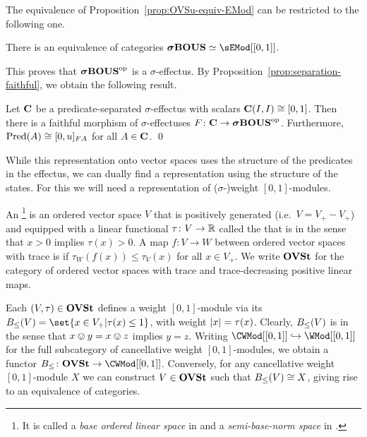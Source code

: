 \documentclass[%
	submission,
copyright,creativecommons,UKenglish]{eptcs}
\begin{document}
The equivalence
of Proposition~\ref{prop:OVSu-equiv-EMod}
can be restricted to the following one.

\begin{proposition}
\label{prop:sBOUS-equiv-sEMod}
There is an equivalence of categories $\sBOUS\simeq\sEMod[[0,1]]$.
\end{proposition}

This proves that $\boldsymbol{\sigma}\mathbf{BOUS}^{\mathrm{op}}$ is a $\sigma$-effectus.
By Proposition~\ref{prop:separation-faithful},
we obtain the following result.

\begin{theorem}\label{thm:convex-effectus-embedding}
Let $\mathbf{C}$ be a predicate-separated $\sigma$-effectus with scalars $\mathbf{C}(I,I)\cong [0,1]$.
Then there is a faithful morphism of $\sigma$-effectuses $F\colon\mathbf{C}\to \boldsymbol{\sigma}\mathbf{BOUS}^{\mathrm{op}}$.
Furthermore, $\mathrm{Pred}(A)\cong [0,u]_{FA}$ for all $A\in \mathbf{C}$. \qed
\end{theorem}

While this representation onto vector spaces uses the structure of the predicates in the effectus, we can dually find a representation using the structure of the states.
For this we will need a representation of ($\sigma$-)weight $[0,1]$-modules.

\begin{definition}
An \footnote{%
It is called a \emph{base ordered linear space}
in \cite{Pumpluen2002}
and a \emph{semi-base-norm space} in \cite{Cho2019PhD}.}
is an ordered vector space $V$
that is positively generated (i.e.\ $V=V_+-V_+$)
and equipped with
a linear functional $\tau\colon V\to \mathbb{R}$ 
called the 
that is 
in the sense that $x>0$ implies $\tau(x)>0$.
A map $f\colon V\to W$ between
ordered vector spaces with trace
is  if
$\tau_W(f(x))\le \tau_V(x)$ for all $x\in V_+$.
We write $\mathbf{OVSt}$ for the category of
ordered vector spaces with trace
and trace-decreasing positive linear maps.
\end{definition}

Each $(V,\tau)\in \mathbf{OVSt}$
defines a weight $[0,1]$-module
via its 
$\sBase(V) =\set{x\in V_+ | \tau(x)\le 1}$, 
with weight $\lvert x\rvert=\tau(x)$.
Clearly, $B_{\le}(V)$ is 
in the sense that $x\ovee y=x\ovee z$ implies $y=z$.
Writing $\CWMod[[0,1]]\hookrightarrow\WMod[[0,1]]$
for the full subcategory of cancellative weight $[0,1]$-modules,
we obtain a functor $\sBase\colon \OVSt\to\CWMod[[0,1]]$.
Conversely, for any cancellative weight $[0,1]$-module $X$
we can construct $V\in\mathbf{OVSt}$ such that $B_{\le}(V)\cong X$,
giving rise to an equivalence of categories.
\end{document}
